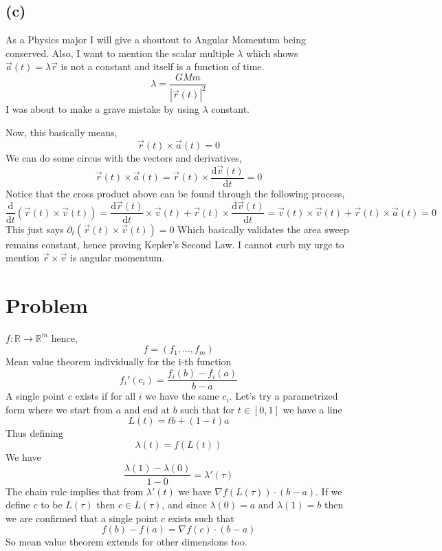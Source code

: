 \documentclass[letter]{article}
\begin{document}
\subsection*{(c)}
As a Physics major I will give a shoutout to Angular Momentum being conserved. Also, I want to mention the scalar multiple $\lambda$ which shows $\vec{a}(t) = \lambda \vec{r}$ is not a constant and itself is a function of time. 
\[
\lambda = \frac{G M m}{|\vec{r}(t)|^2}
\]
I was about to make a grave mistake by using $\lambda$ constant. 

Now, this basically means, 
\[
	\vec{r}(t) \times \vec{a}(t) = 0
\]
We can do some circus with the vectors and derivatives, 
\[
\vec{r}(t) \times \vec{a}(t) = \vec{r}(t) \times  \frac{\mathrm{d} \vec{v}(t)}{\mathrm{d} t}
=0\]
Notice that the cross product above can be found through the following process, 
\[
\frac{\mathrm{d} }{\mathrm{d} t} \left
(\vec{r}(t) \times  \vec{v}(t) 
\right) = 
\frac{\mathrm{d} \vec{r}(t)}{\mathrm{d} t} \times \vec{v}(t) + 
\vec{r}(t) \times \frac{\mathrm{d} \vec{v}(t)}{\mathrm{d} t}
= 
\vec{v}(t) \times \vec{v}(t) + \vec{r}(t) \times \vec{a}(t) = 0
\]
This just says $\partial_t (\vec{r}(t) \times  \vec{v}(t) )= 0$ Which basically validates the area sweep remains constant, hence proving Kepler's Second Law. I cannot curb my urge to mention $\vec{r}\times \vec{v}$ is angular momentum.

\section{Problem} 
$f:\mathbb{R}\to \mathbb{R}^{m}$ hence, 
\[
f = (f_1, \ldots, f_m)
\] 
Mean value theorem individually for the i-th function 
\[
f_i'(c_i) = \frac{f_i(b) - f_i(a)}{b-a}
\] 
A single point $c$ exists if for all $i$ we have the same $c_i$. Let's try a parametrized form where we start from $a$ and end at $b$ such that for $t \in [0,1]$ we have a line 
\[
L(t) = t b + (1- t) a
\] Thus defining 
\[
\lambda(t) = f(L(t))
\]
We have
\[
\frac{\lambda(1) - \lambda(0)}{1 - 0} = \lambda'(\tau)
\]
The chain rule implies that from $\lambda'(t)$ we have $\nabla f(L(\tau)) \cdot (b-a)$. If we define $c$ to be $L(\tau)$ then $c \in L(\tau)$, and since $\lambda(0) = a$ and $\lambda(1)=b$ then we are confirmed that a single point $c$ exists such that
\[
f(b) - f(a) = \nabla f(c) \cdot (b-a)
\] 
So mean value theorem extends for other dimensions too.
\end{document}
